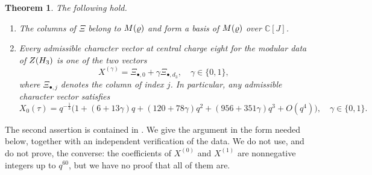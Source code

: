 \documentclass[leqno]{article}
\newcommand{\Cbb}{\ensuremath{\mathbb{C}}}
\let\cal\relax
\newcommand{\cal}{\mathcal}
\newtheorem{thm}{Theorem}[section]
\numberwithin{equation}{section}
\begin{document}
\begin{thm}
\label{thm:EG}
The following hold.
\begin{enumerate}
\item The columns of $\Xi$ belong to $\cal M(\varrho)$ and form a basis of $\cal M(\varrho)$ over $\Cbb[J]$.
\item Every admissible character vector at central charge eight for the modular data of $Z(\cal H_3)$ is one of the two vectors
\begin{equation}
\label{eq:EG-vectors}
X^{(\gamma)} = \Xi_{\bullet,0}+\gamma\Xi_{\bullet,d_3},\quad \gamma \in \{0,1\},
\end{equation}
where $\Xi_{\bullet,j}$ denotes the column of index $j$. In particular, any admissible character vector satisfies
\begin{equation}
\label{eq:EG-vacuum}
X_0(\tau) = q^{-\frac13}\big(1+(6+13\gamma)q+(120+78\gamma)q^2+(956+351\gamma)q^3+O(q^4)\big),\quad \gamma \in \{0,1\}.
\end{equation}
\end{enumerate}
\end{thm}

The second assertion is contained in \cite[Section 2.4 p.~22]{EvG11}. We give the argument in the form needed below, together with an independent verification of the data. We do not use, and do not prove, the converse: the coefficients of $X^{(0)}$ and $X^{(1)}$ are nonnegative integers up to $q^{60}$, but we have no proof that all of them are.
\end{document}
